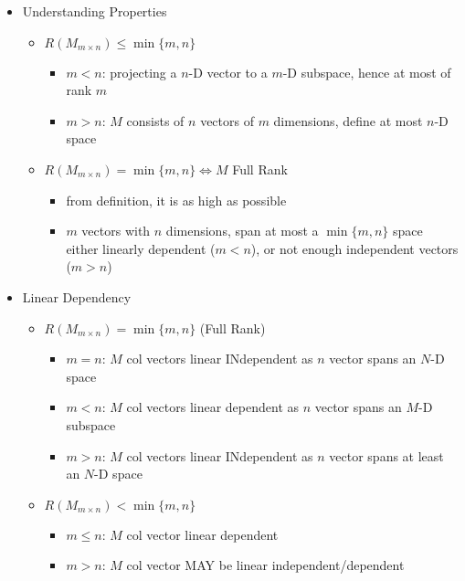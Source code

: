 \begin{itemize}
\item Understanding Properties
	\begin{itemize}
	\item $R(M_{m\times n}) \leq \min\{m, n\}$
		\begin{itemize}
		\item $m<n$: projecting a $n$-D vector to a $m$-D subspace, hence at most of rank $m$
		\item $m>n$: $M$ consists of $n$ vectors of $m$ dimensions, define at most $n$-D space
		\end{itemize}
	\item $R(M_{m\times n}) = \min\{m, n\} \Leftrightarrow M$ Full Rank
		\begin{itemize}
		\item from definition, it is as high as possible
		\item $m$ vectors with $n$ dimensions, span at most a $\min\{m, n\}$ space \\ 
		either linearly dependent ($m<n$), or not enough independent vectors ($m>n$)
		\end{itemize}
	\end{itemize}
	
\item Linear Dependency
	\begin{itemize}
	\item $R(M_{m\times n})=\min\{m,n\}$ (Full Rank)
		\begin{itemize}
		\item $m=n$: $M$ col vectors linear INdependent as $n$ vector spans an $N$-D space
		\item $m<n$: $M$ col vectors linear dependent as $n$ vector spans an $M$-D subspace
		\item $m>n$: $M$ col vectors linear INdependent as $n$ vector spans at least an $N$-D space
		\end{itemize}
	\item $R(M_{m\times n}) < \min\{m,n\}$
		\begin{itemize}
		\item $m\le n$: $M$ col vector linear dependent
		\item $m > n$: $M$ col vector MAY be linear independent/dependent
		\end{itemize}
	\end{itemize}
\end{itemize}

